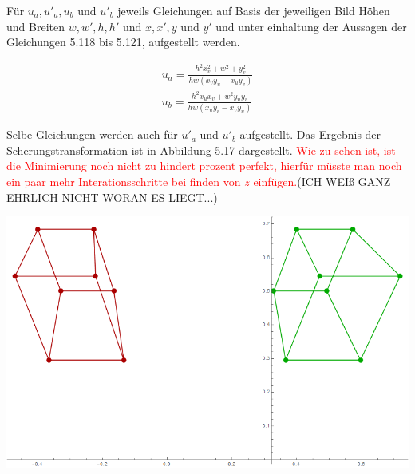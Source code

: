 Für $u_a, u'_a, u_b$ und $u'_b$ jeweils Gleichungen auf Basis der jeweiligen Bild Höhen und Breiten $w,w',h,h'$ und $x,x',y$ und $y'$ und unter einhaltung der Aussagen der Gleichungen 5.118 bis 5.121, aufgestellt werden\cite{ZZ,ACM}. 

\begin{gather}
	u_a = \frac{h^2x_v^2+w^2+y_v^2}{hw(x_vy_u-x_uy_v)}\\
	u_b = \frac{h^2x_ux_v+w^2y_uy_v}{hw(x_uy_v-x_vy_u)}
\end{gather}

Selbe Gleichungen werden auch für $u'_a$ und $u'_b$ aufgestellt. Das Ergebnis der Scherungstransformation ist in Abbildung 5.17 dargestellt. \textcolor{red}{ Wie zu sehen ist, ist die Minimierung noch nicht zu hindert prozent perfekt, hierfür müsste man noch ein paar mehr Interationsschritte bei finden von $z$ einfügen.}(ICH WEIß GANZ EHRLICH NICHT WORAN ES LIEGT...)


\begin{minipage}{\linewidth}
	\centering
	\includegraphics[width=1.\linewidth]{images/Rectification_HsHrHp_same_Solutions.png}
\end{minipage}\\ \\

